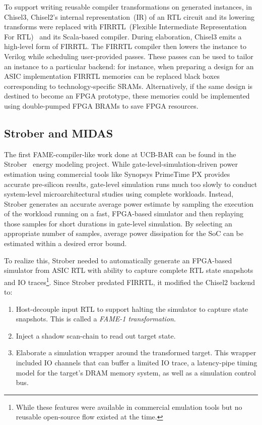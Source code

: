 To support writing reusable compiler transformations on generated instances, in
Chisel3, Chisel2's internal representation~(IR) of an RTL circuit and its
lowering transforms were replaced with FIRRTL~(Flexible Intermediate
Representation For RTL)~\cite{FIRRTL} and its Scala-based compiler. During
elaboration, Chisel3 emits a high-level form of FIRRTL. The FIRRTL compiler
then lowers the instance to Verilog while scheduling user-provided passes. These passes can be used to
tailor an instance to a particular backend: for instance, when preparing a
design for an ASIC implementation FIRRTL memories can be replaced
black boxes corresponding to technology-specific SRAMs. Alternatively, if the same
design is destined to become an FPGA prototype, these memories could be implemented using double-pumped
FPGA BRAMs to save FPGA resources.

\subsection{Strober and MIDAS}\label{sec:midas-intro}

The first FAME-compiler-like work done at UCB-BAR can be found in the
Strober~\cite{Strober} energy modeling project. While
gate-level-simulation-driven power estimation using commercial tools like
Synopsys PrimeTime PX provides accurate pre-silicon results, gate-level
simulation runs much too slowly to conduct system-level microarchitectural studies using
complete workloads. Instead, Strober generates an accurate average power
estimate by sampling the execution of the workload running on a fast,
FPGA-based simulator and then replaying those samples for short durations in
gate-level simulation. By selecting an appropriate number of samples, average
power dissipation for the SoC can be estimated within a desired error bound.

To realize this, Strober needed to automatically generate an FPGA-based
simulator from ASIC RTL with ability to capture complete RTL state snapshots
and IO traces\footnote{While these features were available in commercial
emulation tools but no reusable open-source flow existed at the time.}.
Since Strober predated FIRRTL, it modified the Chisel2 backend to:
\begin{enumerate}
    \item Host-decouple input RTL to support halting the simulator to capture
        state snapshots. This is called a \emph{FAME-1 transformation}.
    \item Inject a shadow scan-chain to read out target state.
    \item Elaborate a simulation wrapper around the transformed target. This
        wrapper included IO channels that can buffer a limited IO trace, a
        latency-pipe timing model for the target's DRAM memory system, as well
        as a simulation control bus.
\end{enumerate}

